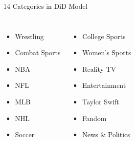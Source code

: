 \documentclass[aspectratio=169,t]{beamer}
\begin{document}
\begin{frame}{14 Categories in DiD Model}
\vspace{0.5em}
\begin{columns}[T]
    \begin{itemize}\setlength\itemsep{0.45em}\small
      \item Wrestling
      \item Combat Sports
      \item NBA
      \item NFL
      \item MLB
      \item NHL
      \item Soccer
    \end{itemize}

    \begin{itemize}\setlength\itemsep{0.45em}\small
      \item College Sports
      \item Women's Sports
      \item Reality TV
      \item Entertainment
      \item Taylor Swift
      \item Fandom
      \item News \& Politics
    \end{itemize}
\end{columns}
\end{frame}
\end{document}

